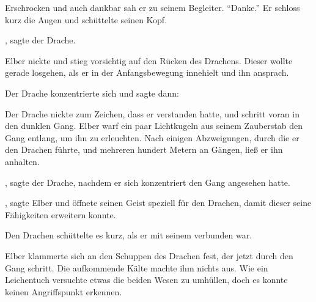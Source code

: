 Erschrocken und auch dankbar sah er zu seinem Begleiter. \enquote{Danke.} Er schloss kurz die Augen und schüttelte seinen Kopf. 

, sagte der Drache. 

Elber nickte und stieg vorsichtig auf den Rücken des Drachens. Dieser wollte gerade losgehen, als er in der Anfangsbewegung innehielt und ihn ansprach.

 Der Drache konzentrierte sich und sagte dann: 


Der Drache nickte zum Zeichen, dass er verstanden hatte, und schritt voran in den dunklen Gang. Elber warf ein paar Lichtkugeln aus seinem Zauberstab den Gang entlang, um ihn zu erleuchten. Nach einigen Abzweigungen, durch die er den Drachen führte, und mehreren hundert Metern an Gängen, ließ er ihn anhalten.




, sagte der Drache, nachdem er sich konzentriert den Gang angesehen hatte.



, sagte Elber und öffnete seinen Geist speziell für den Drachen, damit dieser seine Fähigkeiten erweitern konnte.

Den Drachen schüttelte es kurz, als er mit seinem  verbunden war.


Elber klammerte sich an den Schuppen des Drachen fest, der jetzt durch den Gang schritt. Die aufkommende Kälte machte ihm nichts aus. Wie ein Leichentuch versuchte etwas die beiden Wesen zu umhüllen, doch es konnte keinen Angriffspunkt erkennen.

